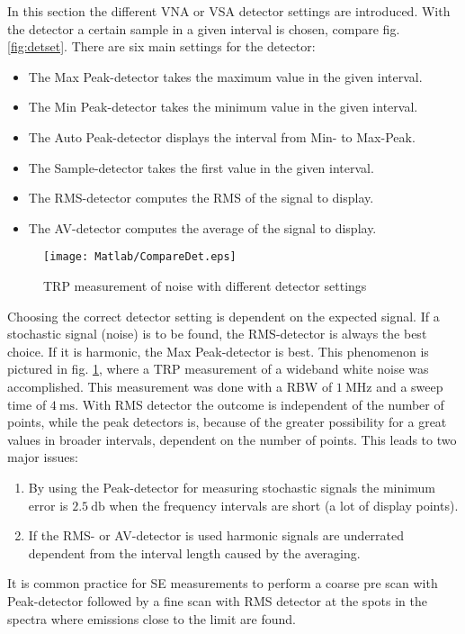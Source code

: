 In this section the different \ac{VNA} or \ac{VSA} detector settings are introduced. With the detector a certain sample in a given interval is chosen, compare fig. \ref{fig:detset}. There are six main settings for the detector: \cite{funsspec}
\begin{itemize}
\item The \textcolor[RGB]{237,28,36}{Max Peak-detector} takes the maximum value in the given interval.
\item The \textcolor[RGB]{0,166,88}{Min Peak-detector} takes the minimum value in the given interval.
\item The \textcolor[RGB]{0,94,138}{Auto Peak-detector} displays the interval from Min- to Max-Peak.
\item The \textcolor[RGB]{0,173,239}{Sample-detector} takes the first value in the given interval.
\item The \textcolor[RGB]{246,135,18}{RMS-detector} computes the \ac{RMS} of the signal to display.
\item The \textcolor[RGB]{114,100,184}{AV-detector} computes the average of the signal to display.
\end{itemize}

\begin{figure}
\centering
\texttt{[image: Matlab/CompareDet.eps]}
\caption{TRP measurement of noise with different detector settings}
\label{fig:trpmeasnoise}
\end{figure}

Choosing the correct detector setting is dependent on the expected signal. If a stochastic signal (noise) is to be found, the \ac{RMS}-detector is always the best choice. If it is harmonic, the Max Peak-detector is best. This phenomenon is pictured in fig. \ref{fig:trpmeasnoise}, where a \ac{TRP} measurement of a wideband white noise was accomplished. This measurement was done with a \ac{RBW} of $\SI{1}{\mega\hertz}$ and a sweep time of $\SI{4}{\milli\second}$. With \ac{RMS} detector the outcome is independent of the number of points, while the peak detectors is, because of the greater possibility for a great values in broader intervals, dependent on the number of points. This leads to two major issues:

\begin{enumerate}
\item By using the Peak-detector for measuring stochastic signals the minimum error is $\SI{2.5}{\decibel}$ when the frequency intervals are short (a lot of display points).
\item If the \ac{RMS}- or AV-detector is used harmonic signals are underrated dependent from the interval length caused by the averaging.
\end{enumerate} 

It is common practice for \ac{SE} measurements to perform a coarse pre scan with Peak-detector followed by a fine scan with \ac{RMS} detector at the spots in the spectra where emissions close to the limit are found.


